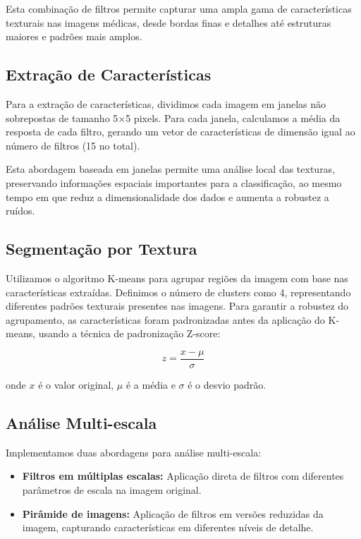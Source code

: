 \documentclass[sigconf,nonacm]{acmart}
\begin{document}
Esta combinação de filtros permite capturar uma ampla gama de características texturais nas imagens médicas, desde bordas finas e detalhes até estruturas maiores e padrões mais amplos.

\subsection{Extração de Características}

Para a extração de características, dividimos cada imagem em janelas não sobrepostas de tamanho 5×5 pixels. Para cada janela, calculamos a média da resposta de cada filtro, gerando um vetor de características de dimensão igual ao número de filtros (15 no total).

Esta abordagem baseada em janelas permite uma análise local das texturas, preservando informações espaciais importantes para a classificação, ao mesmo tempo em que reduz a dimensionalidade dos dados e aumenta a robustez a ruídos.

\subsection{Segmentação por Textura}

Utilizamos o algoritmo K-means para agrupar regiões da imagem com base nas características extraídas. Definimos o número de clusters como 4, representando diferentes padrões texturais presentes nas imagens. Para garantir a robustez do agrupamento, as características foram padronizadas antes da aplicação do K-means, usando a técnica de padronização Z-score:

\[
z = \frac{x - \mu}{\sigma}
\]

onde \(x\) é o valor original, \(\mu\) é a média e \(\sigma\) é o desvio padrão.

\subsection{Análise Multi-escala}

Implementamos duas abordagens para análise multi-escala:

\begin{itemize}
  \item \textbf{Filtros em múltiplas escalas:} Aplicação direta de filtros com diferentes parâmetros de escala na imagem original.
  \item \textbf{Pirâmide de imagens:} Aplicação de filtros em versões reduzidas da imagem, capturando características em diferentes níveis de detalhe.
\end{itemize}
\end{document}
